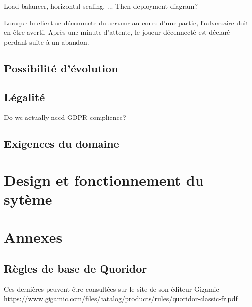 \documentclass[french, utf8]{article}
\begin{document}
Load balancer, horizontal scaling, ... Then deployment diagram?

Lorsque le client se déconnecte du serveur au cours d'une partie, l'adversaire doit en être averti.
Après une minute d'attente, le joueur déconnecté est déclaré perdant suite à un abandon.


\subsection{Possibilité d'évolution}


\subsection{Légalité}

Do we actually need GDPR complience?

\subsection{Exigences du domaine}


\section{Design et fonctionnement du sytème}


\section{Annexes}
\label{sec:Annexes}
\subsection{Règles de base de Quoridor}
Ces dernières peuvent être consultées sur le site de son éditeur Gigamic \href{https://www.gigamic.com/files/catalog/products/rules/quoridor-classic-fr.pdf}{https://www.gigamic.com/files/catalog/products/rules/quoridor-classic-fr.pdf}
\end{document}
